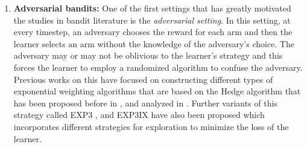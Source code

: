 \begin{enumerate}
\item \textbf{Adversarial bandits: } One of the first settings that has greatly motivated the studies in bandit literature is the \textit{adversarial setting}. In this setting, at every timestep, an adversary chooses the reward for each arm and then the learner selects an arm without the knowledge of the adversary's choice. The adversary may or may not be oblivious to the learner's strategy and this forces the learner to employ a randomized algorithm to confuse the adversary. Previous works on this have focused on constructing different types of exponential weighting algorithms that are based on the Hedge algorithm that has been proposed before in \citet{littlestone1994weighted},\citet{freund1995desicion} and analyzed in \citet{auer1995gambling}. Further variants of this strategy called EXP3 \citep{auer2002nonstochastic}, \citep{auer2002using} and EXP3IX \citep{kocak2014efficient} have also been proposed which incorporates different strategies for exploration to minimize the loss of the learner.




\end{enumerate}
